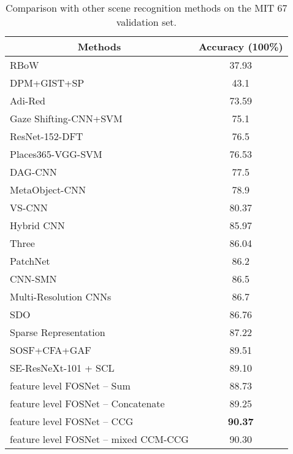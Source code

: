 \documentclass[journal,comsoc]{IEEEtran}
\begin{document}
\begin{table}[]
\centering
\caption{Comparison with other scene recognition methods on the MIT 67 \cite{b34} validation set.}
\begin{tabular}{lc}
\toprule
\multicolumn{1}{c}{Methods}           & Accuracy (100\%) \\
\midrule
RBoW \cite{b1}                        & 37.93            \\
DPM+GIST+SP \cite{b2}                 & 43.1             \\
Adi-Red \cite{b6}                     & 73.59            \\
Gaze Shifting-CNN+SVM \cite{b12}      & 75.1             \\
ResNet-152-DFT \cite{b48}       & 76.5             \\
Places365-VGG-SVM \cite{b20}          & 76.53            \\
DAG-CNN \cite{b10}                    & 77.5             \\
MetaObject-CNN \cite{b14}             & 78.9             \\
VS-CNN \cite{b15}                     & 80.37            \\
Hybrid CNN \cite{b8}                  & 85.97            \\
Three \cite{b7}                       & 86.04            \\
PatchNet \cite{b16}                   & 86.2             \\
CNN-SMN \cite{b13}                    & 86.5             \\
Multi-Resolution CNNs \cite{b5}       & 86.7             \\
SDO \cite{b9}                         & 86.76            \\
Sparse Representation \cite{b17}      & 87.22            \\
SOSF+CFA+GAF \cite{b4}                & 89.51            \\
SE-ResNeXt-101 + SCL                  & 89.10            \\
feature level FOSNet – Sum            & 88.73            \\
feature level FOSNet – Concatenate    & 89.25            \\
feature level FOSNet – CCG           & \textbf{90.37}   \\
feature level FOSNet – mixed CCM-CCG & 90.30           \\
\bottomrule
\end{tabular}
\label{tab3}
\end{table}
\end{document}
